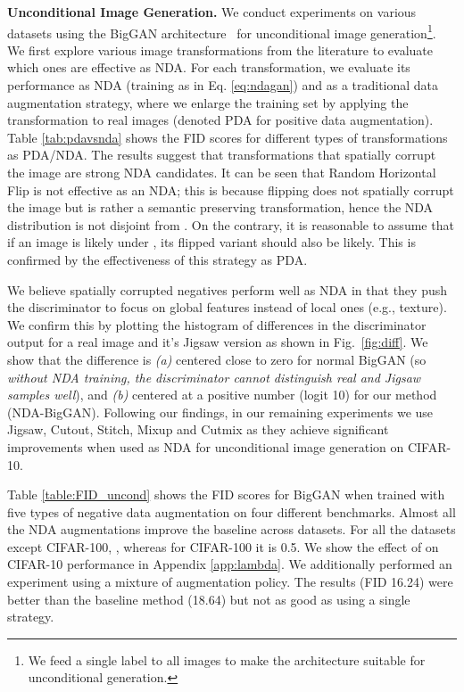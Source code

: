 \documentclass{article} \usepackage{iclr2021_conference,times}
\begin{document}
\textbf{Unconditional Image Generation.} We conduct experiments on various datasets using the BigGAN architecture~\citep{brock2018large} for unconditional image generation\footnote{We feed a single label to all images to make the architecture suitable for unconditional generation.}. We first explore various image transformations 
from the literature to evaluate which ones are effective as NDA. For each transformation, we evaluate its performance as NDA (training as in Eq. \ref{eq:ndagan}) and as a traditional data augmentation strategy, where we enlarge the training set 
by applying the transformation to real images (denoted PDA for positive data augmentation).
Table \ref{tab:pdavsnda} shows the FID scores for different types of transformations as PDA/NDA. The results suggest that transformations that spatially corrupt the image are strong NDA candidates. It can be seen that Random Horizontal Flip is not effective as an NDA; this is because flipping does not spatially corrupt the image but is rather a semantic preserving transformation, hence the NDA distribution  is not disjoint from . On the contrary, it is reasonable to assume that if an image is likely under , its flipped variant should also be likely. This is confirmed by the effectiveness of this strategy as PDA.





We believe spatially corrupted negatives perform well as NDA in that they push the 
discriminator to focus on global features instead of local ones (e.g., texture). 
We confirm this by plotting the histogram of differences in the discriminator output for a real image and it's Jigsaw version as shown in Fig.~\ref{fig:diff}.
We show that the difference is \textit{(a)} centered close to zero for normal BigGAN (so \textit{without NDA training, the discriminator cannot distinguish real and Jigsaw samples well}), and \textit{(b)} centered at a positive number (logit 10) for our method (NDA-BigGAN). Following our findings, in our remaining experiments we use Jigsaw, Cutout, Stitch, Mixup and Cutmix as they achieve significant improvements when used as NDA for unconditional image generation on CIFAR-10.


Table \ref{table:FID_uncond} shows the FID scores for BigGAN when trained with five types of negative data augmentation on four different benchmarks. Almost all the NDA augmentations improve the baseline across datasets.
For all the datasets except CIFAR-100, , whereas for CIFAR-100 it is 0.5. We show the effect of  on CIFAR-10 performance in Appendix \ref{app:lambda}. We additionally performed an experiment using a mixture of augmentation policy. The results (FID 16.24) were better than the baseline method (18.64) but not as good as using a single strategy.
\end{document}
